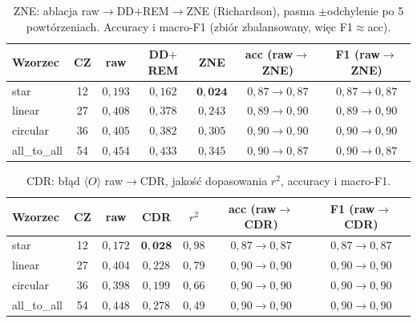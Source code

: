 \documentclass[11pt,a4paper]{article}
\begin{document}
\begin{table}[htbp]
\centering
\small
\caption{ZNE: ablacja raw${}\to{}$DD${+}$REM${}\to{}$ZNE (Richardson), pasma $\pm$odchylenie po
5 powtórzeniach. Accuracy i macro-F1 (zbiór zbalansowany, więc F1${}\approx{}$acc).}
\begin{tabular}{@{}lc ccc cc@{}}
\toprule
Wzorzec & CZ & raw & DD${+}$REM & ZNE & acc (raw${\to}$ZNE) & F1 (raw${\to}$ZNE) \\
\midrule
star        & 12 & $0{,}193$ & $0{,}162$ & $\mathbf{0{,}024}$ & $0{,}87{\to}0{,}87$ & $0{,}87{\to}0{,}87$ \\
linear      & 27 & $0{,}408$ & $0{,}378$ & $0{,}243$ & $0{,}89{\to}0{,}90$ & $0{,}89{\to}0{,}90$ \\
circular    & 36 & $0{,}405$ & $0{,}382$ & $0{,}305$ & $0{,}90{\to}0{,}90$ & $0{,}90{\to}0{,}90$ \\
all\_to\_all & 54 & $0{,}454$ & $0{,}433$ & $0{,}345$ & $0{,}90{\to}0{,}87$ & $0{,}90{\to}0{,}87$ \\
\bottomrule
\end{tabular}
\end{table}

\begin{table}[htbp]
\centering
\small
\caption{CDR: błąd $\langle O\rangle$ raw${}\to{}$CDR, jakość dopasowania $r^2$, accuracy i macro-F1.}
\begin{tabular}{@{}lc cc c cc@{}}
\toprule
Wzorzec & CZ & raw & CDR & $r^2$ & acc (raw${\to}$CDR) & F1 (raw${\to}$CDR) \\
\midrule
star        & 12 & $0{,}172$ & $\mathbf{0{,}028}$ & $0{,}98$ & $0{,}87{\to}0{,}87$ & $0{,}87{\to}0{,}87$ \\
linear      & 27 & $0{,}404$ & $0{,}228$ & $0{,}79$ & $0{,}90{\to}0{,}90$ & $0{,}90{\to}0{,}90$ \\
circular    & 36 & $0{,}398$ & $0{,}199$ & $0{,}66$ & $0{,}90{\to}0{,}90$ & $0{,}90{\to}0{,}90$ \\
all\_to\_all & 54 & $0{,}448$ & $0{,}278$ & $0{,}49$ & $0{,}90{\to}0{,}90$ & $0{,}90{\to}0{,}90$ \\
\bottomrule
\end{tabular}
\end{table}
\end{document}
